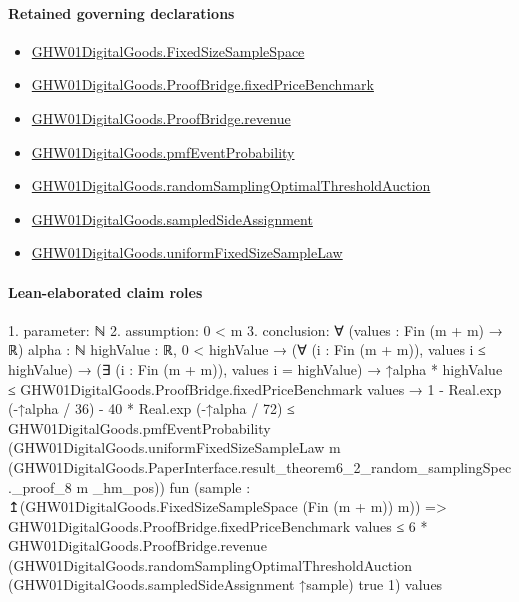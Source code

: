 \documentclass[10pt]{article}
\begin{document}
\paragraph{Retained governing declarations}
\begin{itemize}\raggedright
\item \hyperlink{governing-declaration-54cc4fd1a8d109e5}{GHW01\allowbreak{}Digital\allowbreak{}Goods.\allowbreak{}Fixed\allowbreak{}Size\allowbreak{}Sample\allowbreak{}Space}
\item \hyperlink{governing-declaration-999c32dc6e9adaf2}{GHW01\allowbreak{}Digital\allowbreak{}Goods.\allowbreak{}Proof\allowbreak{}Bridge.\allowbreak{}fixed\allowbreak{}Price\allowbreak{}Benchmark}
\item \hyperlink{governing-declaration-270b06609999bd61}{GHW01\allowbreak{}Digital\allowbreak{}Goods.\allowbreak{}Proof\allowbreak{}Bridge.\allowbreak{}revenue}
\item \hyperlink{governing-declaration-f58112aa068aee00}{GHW01\allowbreak{}Digital\allowbreak{}Goods.\allowbreak{}pmf\allowbreak{}Event\allowbreak{}Probability}
\item \hyperlink{governing-declaration-1a1c7872f59ddc79}{GHW01\allowbreak{}Digital\allowbreak{}Goods.\allowbreak{}random\allowbreak{}Sampling\allowbreak{}Optimal\allowbreak{}Threshold\allowbreak{}Auction}
\item \hyperlink{governing-declaration-d2b25b6b2ab9e137}{GHW01\allowbreak{}Digital\allowbreak{}Goods.\allowbreak{}sampled\allowbreak{}Side\allowbreak{}Assignment}
\item \hyperlink{governing-declaration-e45e78c6f46e232c}{GHW01\allowbreak{}Digital\allowbreak{}Goods.\allowbreak{}uniform\allowbreak{}Fixed\allowbreak{}Size\allowbreak{}Sample\allowbreak{}Law}
\end{itemize}
\paragraph{Lean-elaborated claim roles}\begin{ReviewVerbatim}
1. parameter: ℕ
2. assumption: 0 < m
3. conclusion: ∀ (values : Fin (m + m) → ℝ) {alpha : ℕ} {highValue : ℝ},
  0 < highValue →
    (∀ (i : Fin (m + m)), values i ≤ highValue) →
      (∃ (i : Fin (m + m)), values i = highValue) →
        ↑alpha * highValue ≤ GHW01DigitalGoods.ProofBridge.fixedPriceBenchmark values →
          1 - Real.exp (-↑alpha / 36) - 40 * Real.exp (-↑alpha / 72) ≤
            GHW01DigitalGoods.pmfEventProbability
              (GHW01DigitalGoods.uniformFixedSizeSampleLaw m
                (GHW01DigitalGoods.PaperInterface.result_theorem6_2_random_samplingSpec._proof_8 m _hm_pos))
              fun (sample : ↥(GHW01DigitalGoods.FixedSizeSampleSpace (Fin (m + m)) m)) =>
              GHW01DigitalGoods.ProofBridge.fixedPriceBenchmark values ≤
                6 *
                  GHW01DigitalGoods.ProofBridge.revenue
                    (GHW01DigitalGoods.randomSamplingOptimalThresholdAuction
                      (GHW01DigitalGoods.sampledSideAssignment ↑sample) true 1)
                    values
\end{ReviewVerbatim}
\end{document}
